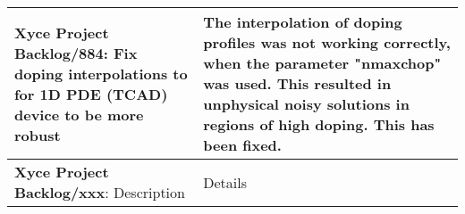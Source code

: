 {\begin{longtable}[h] {>{\raggedright\small}m{2in}|>{\raggedright\let\\\tabularnewline\small}m{3.5in}}
  \textbf{Xyce Project Backlog/884}: Fix doping interpolations to for 1D PDE (TCAD) device to be more robust
  & The interpolation of doping profiles was not working correctly, when the parameter "nmaxchop" was used.  
  This resulted in unphysical noisy solutions in regions of high doping.  This has been fixed.
  \\\hline
  
\textbf{Xyce Project Backlog/xxx}: Description
  &  Details
  \\\hline


\end{longtable}
}
